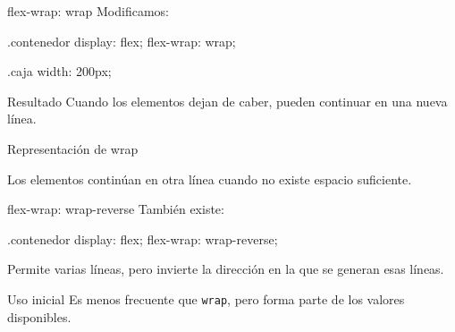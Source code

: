 \documentclass[aspectratio=169,11.5pt]{beamer}
\begin{document}
    \begin{frame}[fragile]{flex-wrap: wrap}
        Modificamos:

        \begin{csscodedark}
            .contenedor {
                display: flex;
                flex-wrap: wrap;
            }

            .caja {
                width: 200px;
            }
        \end{csscodedark}

        \begin{block}{Resultado}
            Cuando los elementos dejan de caber,
            pueden continuar en una nueva línea.
        \end{block}
    \end{frame}

    \begin{frame}{Representación de wrap}
        \begin{center}
        \end{center}

        Los elementos continúan en otra línea
        cuando no existe espacio suficiente.
    \end{frame}

    \begin{frame}[fragile]{flex-wrap: wrap-reverse}
        También existe:

        \begin{csscodedark}
            .contenedor {
                display: flex;
                flex-wrap: wrap-reverse;
            }
        \end{csscodedark}

        Permite varias líneas,
        pero invierte la dirección
        en la que se generan esas líneas.

        \begin{block}{Uso inicial}
            Es menos frecuente que \texttt{wrap},
            pero forma parte de los valores disponibles.
        \end{block}
    \end{frame}
\end{document}

